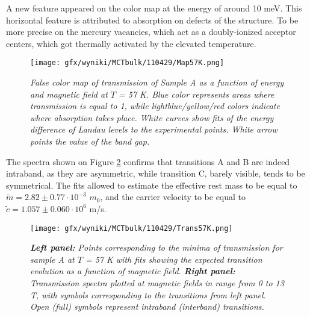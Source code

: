 \documentclass[titlepage,a4paper]{book}
\begin{document}
A new feature appeared on the color map at the energy of around 10 meV. This horizontal feature is attributed to absorption on defects of the structure. To be more precise on the mercury vacancies, which act as a doubly-ionized acceptor centers, which got thermally activated by the elevated temperature.

\begin{figure}[ht]
	\centering
	\texttt{[image: gfx/wyniki/MCTbulk/110429/Map57K.png]}
	\vspace{-10pt}
	\caption{\textit{False color map of transmission of Sample A as a function of energy and magnetic field at $T$ = 57 K. Blue color represents areas where transmission is equal to 1, while lightblue/yellow/red colors indicate where absorption takes place. White curves show fits of the energy difference of Landau levels to the experimental points. White arrow points the value of the band gap.}}
	\label{fig:Map_110429_57K}
\end{figure} 

The spectra shown on Figure \ref{fig:Spectra_110429_57K} confirms that transitions A and B are indeed intraband, as they are asymmetric, while transition C, barely visible, tends to be symmetrical. The fits allowed to estimate the effective rest mass to be equal to $\tilde m = 2.82 \pm 0.77 \cdot 10^{-3}$ $m_0$, and the carrier velocity to be equal to $\tilde{c} = 1.057 \pm 0.060 \cdot 10^6$ m/s. 

\begin{figure}[H]
	\centering
	\texttt{[image: gfx/wyniki/MCTbulk/110429/Trans57K.png]}
	\vspace{-10pt}
	\caption{\textit{\textbf{Left panel:} Points corresponding to the minima of transmission for sample A at $T$ = 57 K with fits showing the expected transition evolution as a function of magnetic field. \textbf{Right panel:} Transmission spectra plotted at magnetic fields in range from 0 to 13 T, with symbols corresponding to the transitions from left panel. Open (full) symbols represent intraband (interband) transitions.}}
	\label{fig:Spectra_110429_57K}
\end{figure}  
\end{document}

